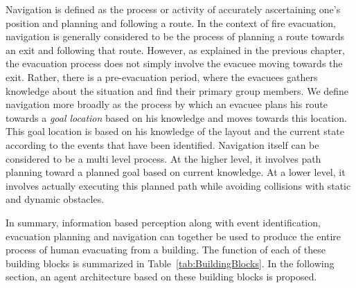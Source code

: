 	Navigation is defined as the process or activity of accurately ascertaining one's position and planning and following a route. In the context of fire evacuation, navigation is generally considered to be the process of planning a route towards an exit and following that route. However, as explained in the previous chapter, the evacuation process does not simply involve the evacuee moving towards the exit. Rather, there is a pre-evacuation period, where the evacuees gathers knowledge about the situation and find their primary group members. We define navigation more broadly as the process by which an evacuee plans his route towards a \emph{goal location} based on his knowledge and moves towards this location. This goal location is based on his knowledge of the layout and the current state according to the events that have been identified. Navigation itself can be considered to be a multi level process. At the higher level, it involves path planning toward a planned goal based on current knowledge. At a lower level, it involves actually executing this planned path while avoiding collisions with static and dynamic obstacles.




In summary, information based perception along with event identification, evacuation planning and navigation can together be used to produce the entire process of human evacuating from a building. The function of each of these building blocks is summarized in Table~\ref{tab:BuildingBlocks}. In the following section, an agent architecture based on these building blocks is proposed.

